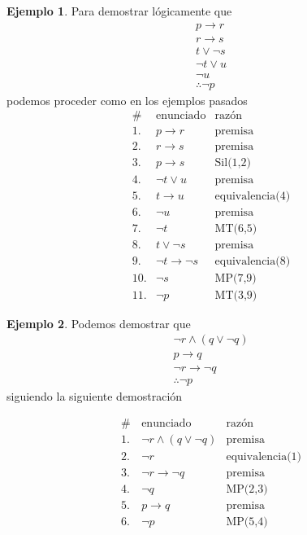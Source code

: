 \documentclass{book}
\theoremstyle{definition}
\newtheorem{ejm}{Ejemplo}[chapter]
\begin{document}
\begin{ejm}
	Para demostrar lógicamente que 
\begin{equation*}\begin{split}
		p \rightarrow r \\ 
		r \rightarrow s \\ 
		t \vee \neg s \\
		\neg t \vee u \\
		\neg u \\
		\hline \therefore \neg p
\end{split}	\end{equation*}
podemos proceder como en los ejemplos pasados
	\begin{align*}
		\# \, & \text{enunciado} & \text{razón}\\
		1.& p \rightarrow r & \text{premisa} \\
		2.& r \rightarrow s & \text{premisa}\\
		3.& p \rightarrow s & \text{Sil(1,2)}\\
		4.& \neg t \vee u & \text{premisa}\\
		5.& t \rightarrow u & \text{equivalencia(4)}\\
		6.& \neg u & \text{premisa}\\
		7.& \neg t & \text{MT(6,5)}\\
		8.& t \vee \neg s & \text{premisa}\\
		9.& \neg t \rightarrow \neg s & \text{equivalencia(8)}\\
		10.& \neg s & \text{MP(7,9)}\\
		11. & \neg p & \text{MT(3,9)}
	\end{align*}
\end{ejm}

\begin{ejm}
	Podemos demostrar que 
	\begin{equation*}\begin{split}
			\neg r \wedge (q \vee \neg q) \\ 
			p \rightarrow q \\ 
			\neg r \rightarrow \neg q \\
			\hline \therefore \neg p
	\end{split}	\end{equation*}
	siguiendo la siguiente demostración
	
	\begin{align*}
	\# \, & \text{enunciado} & \text{razón}\\
	1.& \neg r \wedge (q \vee \neg q) & \text{premisa}\\
	2.& \neg r & \text{equivalencia(1)}\\
	3.& \neg r \rightarrow \neg q &\text{premisa}\\
	4.& \neg q & \text{MP(2,3)}\\
	5.& p \rightarrow q & \text{premisa}\\
	6.& \neg p & \text{MP(5,4)}	
\end{align*}
\end{ejm}
\end{document}
